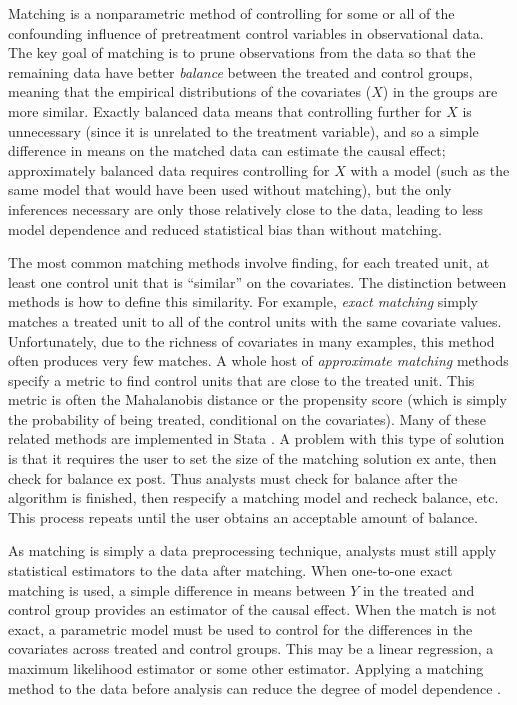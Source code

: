 \documentclass[11pt,titlepage]{article}
\begin{document}
Matching is a nonparametric method of controlling for some or all of
the confounding influence of pretreatment control variables in
observational data.  The key goal of matching is to prune observations
from the data so that the remaining data have better \emph{balance}
between the treated and control groups, meaning that the empirical
distributions of the covariates ($X$) in the groups are more similar.
Exactly balanced data means that controlling further for $X$ is
unnecessary (since it is unrelated to the treatment variable), and so
a simple difference in means on the matched data can estimate the
causal effect; approximately balanced data requires controlling for
$X$ with a model (such as the same model that would have been used
without matching), but the only inferences necessary are only those
relatively close to the data, leading to less model dependence and
reduced statistical bias than without matching.

The most common matching methods involve finding, for each treated unit,
at least one control unit that is ``similar'' on the covariates.  The
distinction between methods is how to define this similarity. For example,
\emph{exact matching} simply matches a treated unit to all of the control
units with the same covariate values. Unfortunately, due to the richness
of covariates in many examples, this method often produces very few
matches. A whole host of \emph{approximate matching} methods specify a
metric to find control units that are close to the treated unit. This
metric is often the Mahalanobis distance or the propensity score (which is
simply the probability of being treated, conditional on the covariates).
Many of these related methods are implemented in Stata  \citep{SasIch02,
  AbaDruHer01, LeuSia04, AbaDiaHai09}.  A problem with this type of solution is
that it requires the user to set the size of the matching solution ex
ante, then check for balance ex post. Thus analysts must check for balance
after the algorithm is finished, then respecify a matching model and
recheck balance, etc. This process repeats until the user obtains an
acceptable amount of balance.

As matching is simply a data preprocessing technique, analysts must still
apply statistical estimators to the data after matching. When one-to-one
exact matching is used, a simple difference in means between $Y$ in the
treated and control group provides an estimator of the causal effect. When
the match is not exact, a parametric model must be used to control for the
differences in the covariates across treated and control groups. This
may be a linear regression, a maximum likelihood estimator or some other
estimator. Applying a matching method to the data before analysis can
reduce the degree of model dependence \citep{HoImaKin07}. 
\end{document}
